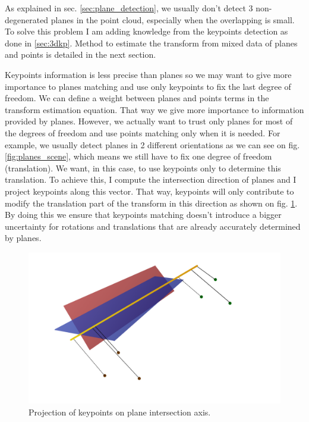 As explained in sec. \ref{sec:plane_detection}, we usually don't detect 3 non-degenerated planes in the point cloud, especially when the overlapping is small. To solve this problem I am adding knowledge from the keypoints detection as done in \ref{sec:3dkp}. Method to estimate the transform from mixed data of planes and points is detailed in the next section.

Keypoints information is less precise than planes so we may want to give more importance to planes matching and use only keypoints to fix the last degree of freedom. We can define a weight between planes and points terms in the transform estimation equation. That way we give more importance to information provided by planes. However, we actually want to trust only planes for most of the degrees of freedom and use points matching only when it is needed. For example, we usually detect planes in 2 different orientations as we can see on fig. \ref{fig:planes_scene}, which means we still have to fix one degree of freedom (translation). We want, in this case, to use keypoints only to determine this translation. To achieve this, I compute the intersection direction of planes and I project keypoints along this vector. That way, keypoints will only contribute to modify the translation part of the transform in this direction as shown on fig. \ref{fig:proj}. By doing this we ensure that keypoints matching doesn't introduce a bigger uncertainty for rotations and translations that are already accurately determined by planes.

\begin{figure}[h!]
\centering
\includegraphics[width=\textwidth]{images/proj.png}
\caption{Projection of keypoints on plane intersection axis.}
\label{fig:proj}
\end{figure}

